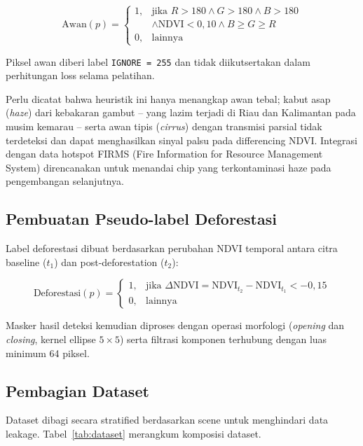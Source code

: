 \documentclass[12pt,a4paper]{article}
\begin{document}
\begin{equation}
    \label{eq:cloud}
    \text{Awan}(p) =
    \begin{cases}
        1, & \text{jika } R > 180 \land G > 180 \land B > 180 \\
           & \land \text{NDVI} < 0,10 \land B \geq G \geq R \\
        0, & \text{lainnya}
    \end{cases}
\end{equation}

Piksel awan diberi label \texttt{IGNORE = 255} dan tidak diikutsertakan dalam
perhitungan loss selama pelatihan.

Perlu dicatat bahwa heuristik ini hanya menangkap awan tebal; kabut asap
(\textit{haze}) dari kebakaran gambut -- yang lazim terjadi di Riau dan
Kalimantan pada musim kemarau -- serta awan tipis (\textit{cirrus}) dengan
transmisi parsial tidak terdeteksi dan dapat menghasilkan sinyal palsu pada
differencing NDVI. Integrasi dengan data hotspot FIRMS (Fire Information
for Resource Management System) direncanakan untuk menandai chip yang
terkontaminasi haze pada pengembangan selanjutnya.

\subsection{Pembuatan Pseudo-label Deforestasi}

Label deforestasi dibuat berdasarkan perubahan NDVI temporal antara citra
baseline ($t_1$) dan post-deforestation ($t_2$):

\begin{equation}
    \label{eq:deforest}
    \text{Deforestasi}(p) =
    \begin{cases}
        1, & \text{jika } \Delta\text{NDVI} = \text{NDVI}_{t_2} - \text{NDVI}_{t_1} < -0,15 \\
        0, & \text{lainnya}
    \end{cases}
\end{equation}

Masker hasil deteksi kemudian diproses dengan operasi morfologi (\textit{opening}
dan \textit{closing}, kernel ellipse $5 \times 5$) serta filtrasi komponen
terhubung dengan luas minimum 64 piksel.

\subsection{Pembagian Dataset}

Dataset dibagi secara stratified berdasarkan scene untuk menghindari data leakage.
Tabel~\ref{tab:dataset} merangkum komposisi dataset.
\end{document}

